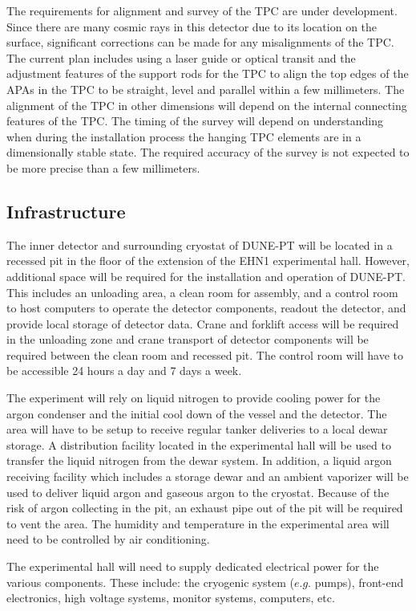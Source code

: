 The requirements for alignment and survey of the TPC are under development. Since there are many cosmic rays in this detector due to its location on the surface, significant corrections can be made for any misalignments of the TPC. The current plan includes using a laser guide or optical transit and the adjustment features of the support rods for the TPC to align the top edges of the APAs in the TPC to be straight, level and parallel within a few millimeters. The alignment of the TPC in other dimensions will depend on the internal connecting features of the TPC.  The timing of the survey will depend on understanding when during the installation process the hanging TPC elements are in a dimensionally stable state. The required accuracy of the survey is not expected to be more precise than a few millimeters.  


\subsection{Infrastructure}

The inner detector and surrounding cryostat of DUNE-PT will be located in a recessed pit in the floor of the extension of the EHN1 experimental hall.  However, additional space will be required for the installation and operation of DUNE-PT.  This includes an unloading area, a clean room for assembly, and a control room to host computers to operate the detector components, readout the detector, and provide local storage of detector data.  Crane and forklift access will be required in the unloading zone and crane transport of detector components will be required between the clean room and recessed pit.  The control room will have to be accessible 24 hours a day and 7 days a week.

The experiment will rely on liquid nitrogen to provide cooling power for the argon condenser and the initial cool down of the vessel and the detector.  The area will have to be setup to receive regular tanker deliveries to a local dewar storage.  A distribution facility located in the experimental hall will be used to transfer the liquid nitrogen from the dewar system.  In addition, a liquid argon receiving facility which includes a storage dewar and an ambient vaporizer will be used to deliver liquid argon and gaseous argon to the cryostat.  Because of the risk of argon collecting in the pit, an exhaust pipe out of the pit will be required to vent the area.  The humidity and temperature in the experimental area will need to be controlled by air conditioning.   

The experimental hall will need to supply dedicated electrical power for the various components. These include:
the cryogenic system ($e.g.$ pumps), front-end electronics, high voltage systems, monitor systems, computers, etc.


